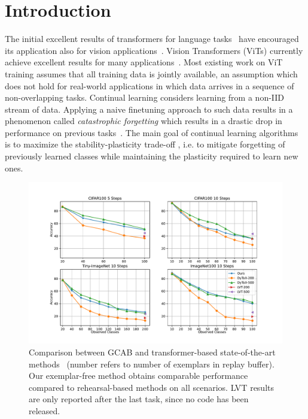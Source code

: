 \documentclass[twocolumn]{svjour3}          %
\begin{document}
\section{Introduction}\label{sec1}
The initial excellent results of transformers for language tasks~\citep{vaswani2017attention} have encouraged its application also for vision applications~\citep{dosovitskiy2020image}. Vision Transformers (ViTs) currently achieve excellent results for many applications~\citep{caron2021emerging,liu2021swin,strudel2021segmenter}. Most existing work on ViT training assumes that all training data is jointly available, an assumption which does not hold for real-world applications in which data arrives in a sequence of non-overlapping tasks. Continual learning considers learning from a non-IID stream of data. Applying a naive finetuning approach to such data results in a phenomenon called \emph{catastrophic forgetting} which results in a drastic drop in performance on previous tasks~\citep{goodfellow2014empirical}. The main goal of continual learning algorithms is to maximize the stability-plasticity trade-off \citep{mermillod2013stability}, i.e. to mitigate forgetting of previously learned classes while maintaining the plasticity required to learn new ones. 

\begin{figure}
    \centering
    \includegraphics[width=\linewidth]{images/plot_all.pdf}
    \vspace{-0.4cm}
    \caption{Comparison between GCAB and transformer-based state-of-the-art methods~\citep{douillard2022dytox, wang2022continual} (number refers to number of exemplars in replay buffer). Our exemplar-free method obtains comparable performance compared to rehearsal-based methods on all scenarios. LVT results are only reported after the last task, since no code has been released.}
    \label{fig:allscenarios}
\end{figure}
\end{document}
